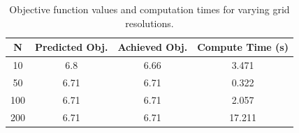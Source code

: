 \begin{table}
    \centering
    \begin{tabular}{cccc}
        \hline
        N & Predicted Obj. & Achieved Obj. & Compute Time (s) \\
        \hline
        10 & 6.8 & 6.66 & 3.471\\
        50 & 6.71 & 6.71 & 0.322\\
        100 & 6.71 & 6.71 & 2.057\\
        200 & 6.71 & 6.71 & 17.211\\
        \hline
    \end{tabular}
    \caption{Objective function values and computation times for varying grid resolutions.}
    \label{tab:grid_resolution}
\end{table}
